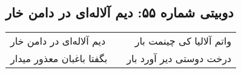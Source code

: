 \begin{center}
\section*{دوبیتی شماره ۵۵: دیم آلاله‌ای در دامن خار}
\label{sec:055}
\begin{longtable}{l p{0.5cm} r}
دیم آلاله‌ای در دامن خار
&&
واتم آلالیا کی چینمت بار
\\
بگفتا باغبان معذور میدار
&&
درخت دوستی دیر آورد بار
\\
\end{longtable}
\end{center}
